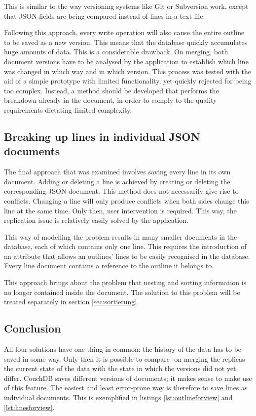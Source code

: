 This is similar to the way versioning systems like Git or Subversion work, except that JSON fields are being compared instead of lines in a text file.

Following this approach, every write operation will also cause the entire outline to be saved as a new version. This means that the database quickly accumulates huge amounts of data. This is a considerable drawback. On merging, both document versions have to be analysed by the application to establish which line was changed in which way and in which version. This process was tested with the aid of a simple prototype with limited functionality, yet quickly rejected for being too complex. Instead, a method should be developed that performs the breakdown already in the document, in order to comply to the quality requirements dictating limited complexity.

\subsection{Breaking up lines in individual JSON documents}

The final approach that was examined involves saving every line in its own document. Adding or deleting a line is achieved by creating or deleting the corresponding JSON document. This method does not necessarily give rise to conflicts. Changing a line will only produce conflicts when both sides change this line at the same time. Only then, user intervention is required. This way, the replication issue is relatively easily solved by the application.

This way of modelling the problem results in many smaller documents in the database, each of which contains only one line. This requires the introduction of an attribute that allows an outlines' lines to be easily recognised in the database. Every line document contains a reference to the outline it belongs to.

This approach brings about the problem that nesting and sorting information is no longer contained inside the document. The solution to this problem will be treated separately in section \ref{sec:sortierung}.

\subsection{Conclusion}
\label{subsec:viewabfrage}

All four solutions have one thing in common: the history of the data has to be saved in some way. Only then it is possible to compare -on merging the replicas- the current state of the data with the state in which the versions did not yet differ. CouchDB saves different versions of documents; it makes sense to make use of this feature. The easiest and least error-prone way is therefore to save lines as individual documents. This is exemplified in listings \ref{lst:outlineforview} and \ref{lst:linesforview}.


